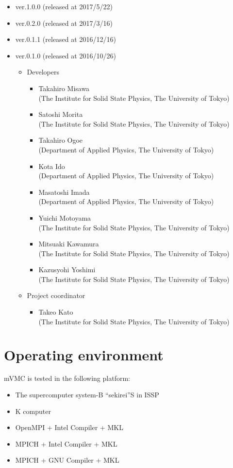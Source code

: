 \begin{itemize}
\item{ver.1.0.0 (released at 2017/5/22)}
\item{ver.0.2.0 (released at 2017/3/16)}
\item{ver.0.1.1 (released at 2016/12/16)}
\item{ver.0.1.0 (released at 2016/10/26)}
\begin{itemize}
\item{Developers}
	\begin{itemize}
	\item{Takahiro Misawa \\(The Institute for Solid State Physics, The University of Tokyo)}
	\item{Satoshi Morita \\(The Institute for Solid State Physics, The University of Tokyo)}
	\item{Takahiro Ogoe \\(Department of Applied Physics, The University of Tokyo)}
	\item{Kota Ido \\(Department of Applied Physics, The University of Tokyo)}
	\item{Masatoshi Imada \\(Department of Applied Physics, The University of Tokyo)}
	\item{Yuichi Motoyama \\(The Institute for Solid State Physics, The University of Tokyo)}
	\item{Mitsuaki Kawamura \\(The Institute for Solid State Physics, The University of Tokyo)}
	\item{Kazusyohi Yoshimi \\(The Institute for Solid State Physics, The University of Tokyo)}
	\end{itemize}

\item{Project coordinator}
	\begin{itemize}
	\item{Takeo Kato \\(The Institute for Solid State Physics, The University of Tokyo)}
	\end{itemize}

\end{itemize}

\end{itemize}


\section{Operating environment}
mVMC is tested in the following platform:
\begin{itemize}
\item The supercomputer system-B ``sekirei''S in ISSP
\item K computer
\item OpenMPI + Intel Compiler + MKL
\item MPICH + Intel Compiler + MKL
\item MPICH + GNU Compiler + MKL
\end{itemize}
